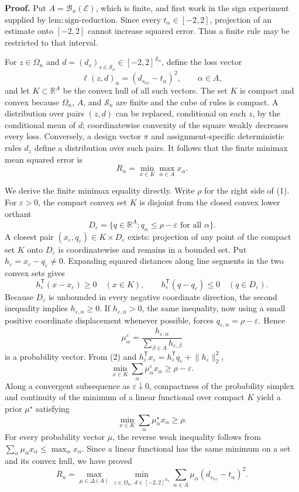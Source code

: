 \textbf{Proof.}
Put \(A=\mathcal B_n(\mathcal E)\), which is finite, and first work in the sign experiment supplied by \(\mathrm{lem{:}sign\text{-}reduction}\).  Since every \(t_\alpha\in[-2,2]\), projection of an estimate onto \([-2,2]\) cannot increase squared error.  Thus a finite rule may be restricted to that interval.

For \(z\in\Omega_n\) and \(d=(d_s)_{s\in\mathcal S_n}\in[-2,2]^{\mathcal S_n}\), define the loss vector
\[
 \ell(z,d)_\alpha=(d_{s_{\alpha z}}-t_\alpha)^2,
 \qquad \alpha\in A,
\]
and let \(K\subset\mathbb R^A\) be the convex hull of all such vectors.  The set \(K\) is compact and convex because \(\Omega_n\), \(A\), and \(\mathcal S_n\) are finite and the cube of rules is compact.  A distribution over pairs \((z,d)\) can be replaced, conditional on each \(z\), by the conditional mean of \(d\); coordinatewise convexity of the square weakly decreases every loss.  Conversely, a design vector \(\pi\) and assignment-specific deterministic rules \(d_z\) define a distribution over such pairs.  It follows that the finite minimax mean squared error is
\[
 R_n=\min_{x\in K}\max_{\alpha\in A}x_\alpha. \tag{1}
\]

We derive the finite minimax equality directly.  Write \(\rho\) for the right side of (1).  For \(\varepsilon>0\), the compact convex set \(K\) is disjoint from the closed convex lower orthant
\[
 D_\varepsilon=\{q\in\mathbb R^A:q_\alpha\le\rho-\varepsilon
 \text{ for all }\alpha\}.
\]
A closest pair \((x_\varepsilon,q_\varepsilon)\in K\times D_\varepsilon\) exists: projection of any point of the compact set \(K\) onto \(D_\varepsilon\) is coordinatewise and remains in a bounded set.  Put \(h_\varepsilon=x_\varepsilon-q_\varepsilon\ne0\).  Expanding squared distances along line segments in the two convex sets gives
\[
 h_\varepsilon^{\mathsf T}(x-x_\varepsilon)\ge0
 \quad(x\in K),
 \qquad
 h_\varepsilon^{\mathsf T}(q-q_\varepsilon)\le0
 \quad(q\in D_\varepsilon). \tag{2}
\]
Because \(D_\varepsilon\) is unbounded in every negative coordinate direction, the second inequality implies \(h_{\varepsilon,\alpha}\ge0\).  If \(h_{\varepsilon,\alpha}>0\), the same inequality, now using a small positive coordinate displacement whenever possible, forces \(q_{\varepsilon,\alpha}=\rho-\varepsilon\).  Hence
\[
 \mu^\varepsilon_\alpha
 =\frac{h_{\varepsilon,\alpha}}
        {\sum_{\beta\in A}h_{\varepsilon,\beta}}
\]
is a probability vector.  From (2) and
\(h_\varepsilon^{\mathsf T}x_\varepsilon
=h_\varepsilon^{\mathsf T}q_\varepsilon+\lVert h_\varepsilon\rVert_2^2\),
\[
 \min_{x\in K}\sum_\alpha\mu^\varepsilon_\alpha x_\alpha
 \ge \rho-\varepsilon. \tag{3}
\]
Along a convergent subsequence as \(\varepsilon\downarrow0\), compactness of the probability simplex and continuity of the minimum of a linear functional over compact \(K\) yield a prior \(\mu^\star\) satisfying
\[
 \min_{x\in K}\sum_\alpha\mu^\star_\alpha x_\alpha\ge\rho.
\]
For every probability vector \(\mu\), the reverse weak inequality follows from
\(\sum_\alpha\mu_\alpha x_\alpha\le\max_\alpha x_\alpha\).  Since a linear functional has the same minimum on a set and its convex hull, we have proved
\[
 R_n
 =\max_{\mu\in\Delta(A)}
   \min_{z\in\Omega_n,\ d\in[-2,2]^{\mathcal S_n}}
   \sum_{\alpha\in A}\mu_\alpha
   (d_{s_{\alpha z}}-t_\alpha)^2. \tag{4}
\]

